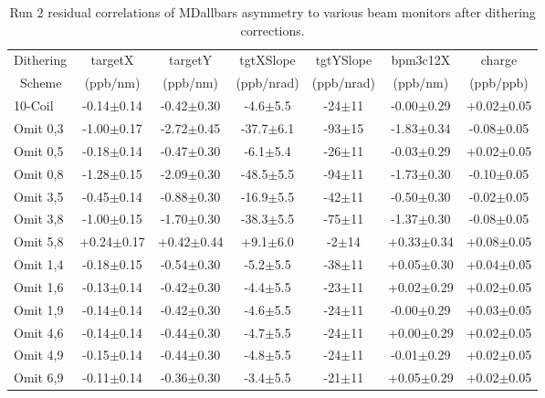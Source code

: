 \begin{landscape}
\begin{table}[!h]

\caption{Run 2 residual correlations of MDallbars asymmetry to various beam monitors after dithering corrections.}
\begin{center}
\begin{tabular}[h]{|l|c|c|c|c|c|c|}\hline
Dithering&targetX&targetY&tgtXSlope&tgtYSlope&bpm3c12X&charge\\
~Scheme&(ppb/nm)&(ppb/nm)&(ppb/nrad)&(ppb/nrad)&(ppb/nm)&(ppb/ppb)\\\hline
10-Coil& -0.14$\pm$0.14& -0.42$\pm$0.30& -4.6$\pm$5.5& -24$\pm$11& -0.00$\pm$0.29& +0.02$\pm$0.05\\\hline
Omit 0,3& \color{red}-1.00$\pm$0.17& \color{red}-2.72$\pm$0.45& \color{red}-37.7$\pm$6.1& \color{red}-93$\pm$15& \color{red}-1.83$\pm$0.34& -0.08$\pm$0.05\\\hline
Omit 0,5& -0.18$\pm$0.14& -0.47$\pm$0.30& -6.1$\pm$5.4& -26$\pm$11& -0.03$\pm$0.29& +0.02$\pm$0.05\\\hline
Omit 0,8& \color{red}-1.28$\pm$0.15& \color{red}-2.09$\pm$0.30& \color{red}-48.5$\pm$5.5& \color{red}-94$\pm$11& \color{red}-1.73$\pm$0.30& -0.10$\pm$0.05\\\hline
Omit 3,5& \color{blue}-0.45$\pm$0.14& -0.88$\pm$0.30& \color{blue}-16.9$\pm$5.5& \color{blue}-42$\pm$11& -0.50$\pm$0.30& -0.02$\pm$0.05\\\hline
Omit 3,8& \color{red}-1.00$\pm$0.15& \color{red}-1.70$\pm$0.30& \color{red}-38.3$\pm$5.5& \color{red}-75$\pm$11& \color{red}-1.37$\pm$0.30& -0.08$\pm$0.05\\\hline
Omit 5,8& +0.24$\pm$0.17& +0.42$\pm$0.44& +9.1$\pm$6.0& -2$\pm$14& +0.33$\pm$0.34& +0.08$\pm$0.05\\\hline
Omit 1,4& -0.18$\pm$0.15& -0.54$\pm$0.30& -5.2$\pm$5.5& \color{blue}-38$\pm$11& +0.05$\pm$0.30& +0.04$\pm$0.05\\\hline
Omit 1,6& -0.13$\pm$0.14& -0.42$\pm$0.30& -4.4$\pm$5.5& -23$\pm$11& +0.02$\pm$0.29& +0.02$\pm$0.05\\\hline
Omit 1,9& -0.14$\pm$0.14& -0.42$\pm$0.30& -4.6$\pm$5.5& -24$\pm$11& -0.00$\pm$0.29& +0.03$\pm$0.05\\\hline
Omit 4,6& -0.14$\pm$0.14& -0.44$\pm$0.30& -4.7$\pm$5.5& -24$\pm$11& +0.00$\pm$0.29& +0.02$\pm$0.05\\\hline
Omit 4,9& -0.15$\pm$0.14& -0.44$\pm$0.30& -4.8$\pm$5.5& -24$\pm$11& -0.01$\pm$0.29& +0.02$\pm$0.05\\\hline
Omit 6,9& -0.11$\pm$0.14& -0.36$\pm$0.30& -3.4$\pm$5.5& -21$\pm$11& +0.05$\pm$0.29& +0.02$\pm$0.05\\\hline

\end{tabular}
\end{center}
\end{table}
\end{landscape}

